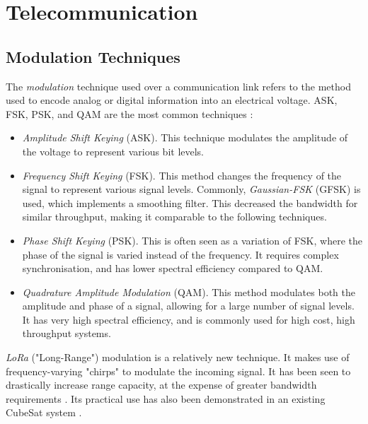 \section{Telecommunication}\label{sec:telecommunication_theory}

\subsection{Modulation Techniques}
The \textit{modulation} technique used over a communication link refers to the method used to encode analog or digital information into an electrical voltage. ASK, FSK, PSK, and QAM are the most common techniques \cite{site-satelliteModulationOverview} \cite{site-satelliteModulationComparison}:
\begin{itemize}
    \item \textit{Amplitude Shift Keying} (ASK). This technique modulates the amplitude of the voltage to represent various bit levels.
    \item \textit{Frequency Shift Keying} (FSK). This method changes the frequency of the signal to represent various signal levels. Commonly, \textit{Gaussian-FSK} (GFSK) is used, which implements a smoothing filter. This decreased the bandwidth for similar throughput, making it comparable to the following techniques.
    \item \textit{Phase Shift Keying} (PSK). This is often seen as a variation of FSK, where the phase of the signal is varied instead of the frequency. It requires complex synchronisation, and has lower spectral efficiency compared to QAM.
    \item \textit{Quadrature Amplitude Modulation} (QAM). This method modulates both the amplitude and phase of a signal, allowing for a large number of signal levels. It has very high spectral efficiency, and is commonly used for high cost, high throughput systems.
\end{itemize}

\textit{LoRa} ("Long-Range") modulation is a relatively new technique. It makes use of frequency-varying "chirps" to modulate the incoming signal. It has been seen to drastically increase range capacity, at the expense of greater bandwidth requirements \cite{datasheet-SX1278}. Its practical use has also been demonstrated in an existing CubeSat system \cite{design-FOSSASATLink}.

